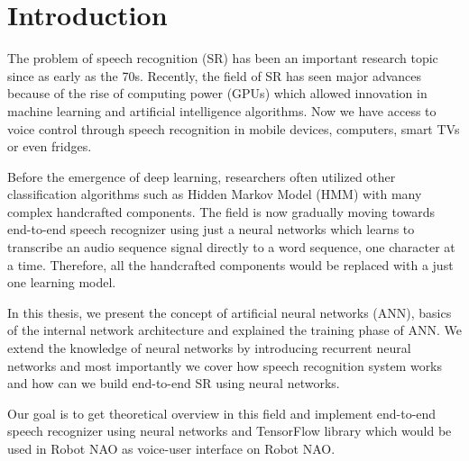 \chapter{Introduction}

The problem of speech recognition (SR) has been an important research topic since as early as the 70s.
Recently, the field of SR has seen major advances because of the rise of computing power (GPUs) which allowed innovation in machine learning and artificial intelligence algorithms.
Now we have access to voice control through speech recognition in mobile devices, computers, smart TVs or even fridges.

Before the emergence of deep learning, researchers often utilized other classification algorithms such as Hidden Markov Model (HMM) with many complex handcrafted components.
The field is now gradually moving towards end-to-end speech recognizer using just a neural networks which learns to transcribe an audio sequence signal directly to a word sequence, one character at a time.
Therefore, all the handcrafted components would be replaced with a just one learning model.


In this thesis, we present the concept of artificial neural networks (ANN), basics of the internal network architecture and explained the training phase of ANN.
We extend the knowledge of neural networks by introducing recurrent neural networks and most importantly we cover how speech recognition system works and how can we build end-to-end SR using neural networks.

Our goal is to get theoretical overview in this field and implement end-to-end speech recognizer using neural networks and TensorFlow library which would be used in Robot NAO as voice-user interface on Robot NAO.
